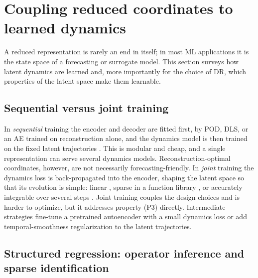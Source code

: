 \section{Coupling reduced coordinates to learned dynamics}
\label{sec:dynamics}

A reduced representation is rarely an end in itself; in most ML applications it
is the state space of a forecasting or surrogate model. This section surveys
how latent dynamics are learned and, more importantly for the choice of DR,
which properties of the latent space make them learnable.

\subsection{Sequential versus joint training}

In \emph{sequential} training the encoder and decoder are fitted first, by POD,
DLS, or an AE trained on reconstruction alone, and the dynamics model is then
trained on the fixed latent trajectories
\parencite{hasegawa2020bluff,nakamura2021channel,solera2024betavae,morton2026scitech}.
This is modular and cheap, and a single representation can serve several
dynamics models. Reconstruction-optimal coordinates, however, are not
necessarily forecasting-friendly. In \emph{joint} training the dynamics loss is
back-propagated into the encoder, shaping the latent space so that its
evolution is simple: linear \parencite{lusch2018koopman,otto2019linearly},
sparse in a function library \parencite{champion2019sindyae}, or accurately
integrable over several steps \parencite{fresca2021dlrom}. Joint training
couples the design choices and is harder to optimize, but it addresses property
(P3) directly. Intermediate strategies fine-tune a pretrained autoencoder with
a small dynamics loss or add temporal-smoothness regularization to the latent
trajectories.

\subsection{Structured regression: operator inference and sparse identification}

